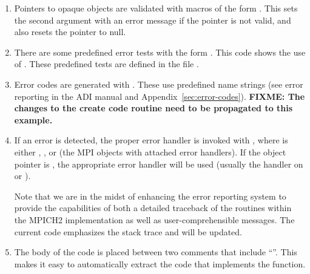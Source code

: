 \documentclass{article}
\def\fixme#1{\marginpar{FIXME:}\textbf{FIXME: #1}}
\begin{document}
\begin{enumerate}
%

\item Pointers to opaque objects are validated with macros of the
  form .  This sets the second argument with an
  error message if the pointer is not valid, and also resets the pointer
  to null. 

\item There are some predefined error tests with the form
  .   This code shows the use of
  .  These predefined tests are defined
  in the file .

\item Error codes are generated with .  These use
  predefined name strings (see error reporting in the ADI manual and
  Appendix~\ref{sec:error-codes}).  \fixme{The changes to the create
  code routine need to be propagated to this example.}

\item If an error is detected, the proper error handler is invoked
  with , where  is either
  , , or  (the MPI objects with attached
  error handlers).  If the object pointer is , the
  appropriate error handler will be used (usually the handler on
   or ).

  Note that we are in the midst of enhancing the error reporting
  system to provide the capabilities of both a detailed traceback of
  the routines within the MPICH2 implementation as well as
  user-comprehensible messages.  The current code emphasizes the stack
  trace and will be updated.

\item The body of the code is placed between two comments that include
  ``''.  This makes it easy to automatically
  extract the code that implements the function.


\end{enumerate}
\end{document}
